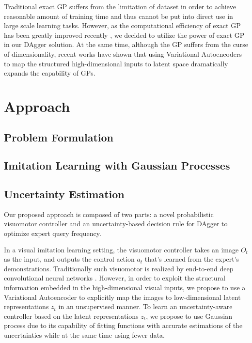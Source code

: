 \documentclass[11pt, reqno, letterpaper, twoside]{amsart}
\begin{document}
Traditional exact GP suffers from the limitation of dataset in order to achieve reasonable amount of training time and thus cannot be put into direct use in large scale learning tasks. However, as the computational efficiency of exact GP has been greatly improved recently \cite{exact-gp-million,GPyTorch}, we decided to utilize the power of exact GP in our DAgger solution. At the same time, although the GP suffers from the curse of dimensionality, recent works have shown that using Variational Autoencoders to map the structured high-dimensional inputs to latent space \cite{grosnit2021high} dramatically expands the capability of GPs.


\section{Approach}
\subsection{Problem Formulation} 

\subsection{Imitation Learning with Gaussian Processes}

\subsection{Uncertainty Estimation}


Our proposed approach is composed of two parts: a novel probabilistic visuomotor controller and an uncertainty-based decision rule for DAgger to optimize expert query frequency. 

In a visual imitation learning setting, the visuomotor controller takes an image $O_t$ as the input, and outputs the control action $a_t$ that's learned from the expert's demonstrations. Traditionally such visuomotor is realized by end-to-end deep convolutional neural networks \cite{pmlr-v78-finn17a}. However, in order to exploit the structural information embedded in the high-dimensional visual inputs, we propose to use a Variational Autoencoder to explicitly map the images to low-dimensional latent representations $z_t$ in an unsupervised manner. To learn an uncertainty-aware controller based on the latent representations $z_t$, we propose to use Gaussian process due to its capability of fitting functions with accurate estimations of the uncertainties while at the same time using fewer data. 
\end{document}
